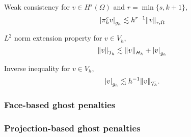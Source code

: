 \begin{assumption}[EP2]
    \label{as:EP2}
    Weak consistency for $v \in H^{s}( \Omega ) $ and $r = \min\{s, k+1\} $, \[
    \left\lvert  \pi ^{e}_{h} v  \right\rvert_{g_{h}} \lesssim  h^{r-1} \| v \|_{ r,\Omega  }^{  }
    \]
\end{assumption}

\begin{assumption}[EP3]
    \label{as:EP3}
    $L^{2}$ norm extension property for $v \in V_{h}$,\[
    \| v \|_{ \mathcal{T} _{h} }^{  } \lesssim \| v  \|_{H_{h}  }^{  }   + \left\lvert  v  \right\rvert _{g_{h}}
    \]
\end{assumption}

\begin{assumption}[EP4]
    \label{as:EP4}
    Inverse inequality for $v \in  V_{h}$,
    \[
    \left\lvert  v  \right\rvert _{g_{h}} \lesssim h^{-1} \| v \|_{ \mathcal{T} _{h} }^{  } .
    \]
\end{assumption}



\subsubsection{Face-based ghost penalties}%
\label{ssub:face_based_ghost_penalties}

\subsubsection{Projection-based ghost penalties}%
\label{ssub:projection_based_ghost_penalties}


